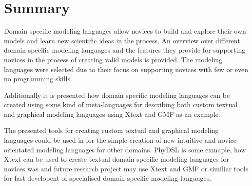 \documentclass[runningheads,a4paper]{llncs}
\begin{document}
\section{Summary}\label{sec:summary}
Domain specific modeling languages allow novices to build and explore  their own models and learn new scientific ideas in the process.
An overview over different domain specific modeling languages and the features they provide for 
supporting novices in the process of creating valid models is provided. 
The modeling languages were selected due to their focus on supporting novices with few or even no programming skills.

Additionally it is presented how domain specific modeling languages can be created using some kind of meta-languages
for describing both custom textual and graphical modeling languages using Xtext and GMF as an example.

The presented tools for creating custom textual and graphical modeling languages could be used in for the simple creation of new intuitive and 
novice orientated modeling languages for other domains. PhyDSL is some exmaple, how Xtext can be used to create textual domain-specific modeling languages 
for novices was and future research project may use Xtext and GMF or similiar tools for fast developent of specialised domain-specific modeling languages.  

% 
% 
\nocite{*}



\end{document}
